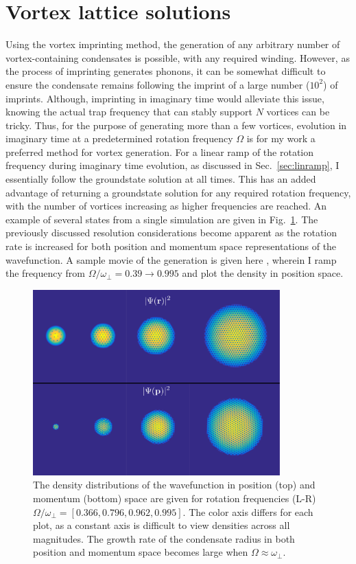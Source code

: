 \section{Vortex lattice solutions}
Using the vortex imprinting method, the generation of any arbitrary number of vortex-containing condensates is possible, with any required winding. However, as the process of imprinting generates phonons, it can be somewhat difficult to ensure the condensate remains following the imprint of a large number ($10^2$) of imprints. Although, imprinting in imaginary time would alleviate this issue, knowing the actual trap frequency that can stably support $N$ vortices can be tricky. Thus, for the purpose of generating more than a few vortices, evolution in imaginary time at a predetermined rotation frequency $\Omega$ is for my work a preferred method for vortex generation. For a linear ramp of the rotation frequency during imaginary time evolution, as discussed in Sec.~\ref{sec:linramp}, I essentially follow the groundstate solution at all times. This has an added advantage of returning a groundstate solution for any required rotation frequency, with the number of vortices increasing as higher frequencies are reached. An example of several states from a single simulation are given in Fig.~\ref{fig:inc_omega}. The previously discussed resolution considerations become apparent as the rotation rate is increased for both position and momentum space representations of the wavefunction. A sample movie of the generation is given here \cite{MLXD:movie_groundstates}, wherein I ramp the frequency from $\Omega/\omega_\perp = 0.39 \to 0.995$ and plot the density in position space.

\begin{figure}\centering
    \includegraphics[width=0.85\textwidth]{Images/ch4_vtx/ramp_omega.pdf}
    \caption{The density distributions of the wavefunction in position (top) and momentum (bottom) space are given for rotation frequencies (L-R) $\Omega/\omega_\perp=[0.366,0.796,0.962,0.995]$. The color axis differs for each plot, as a constant axis is difficult to view densities across all magnitudes. The growth rate of the condensate radius in both position and momentum space becomes large when $\Omega \approx \omega_\perp$.}
    \label{fig:inc_omega}
\end{figure}

